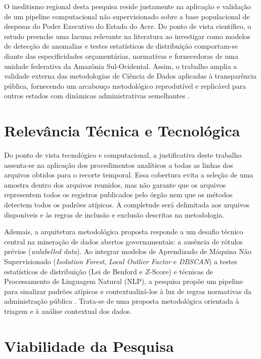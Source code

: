 \documentclass[
    12pt,               %
    openright,          %
    oneside,            %
    a4paper,            %
    chapter=TITLE,      %
    sumario=tradicional,%
    english,            %
    brazilian,          %
 ]{abntex2}
\begin{document}
O ineditismo regional desta pesquisa reside justamente na aplicação e validação de um pipeline computacional não supervisionado sobre a base populacional de despesas do Poder Executivo do Estado do Acre. Do ponto de vista científico, o estudo preenche uma lacuna relevante na literatura ao investigar como modelos de detecção de anomalias e testes estatísticos de distribuição comportam-se diante das especificidades orçamentárias, normativas e fornecedoras de uma unidade federativa da Amazônia Sul-Ocidental. Assim, o trabalho amplia a validade externa das metodologias de Ciência de Dados aplicadas à transparência pública, fornecendo um arcabouço metodológico reprodutível e replicável para outros estados com dinâmicas administrativas semelhantes \cite{pereira2025}.

\section{Relevância Técnica e Tecnológica}\label{sec:relevancia_tecnica}

Do ponto de vista tecnológico e computacional, a justificativa deste trabalho assenta-se na aplicação dos procedimentos analíticos a todas as linhas dos arquivos obtidos para o recorte temporal. Essa cobertura evita a seleção de uma amostra dentro dos arquivos reunidos, mas não garante que os arquivos representem todos os registros publicados pelo órgão nem que os métodos detectem todos os padrões atípicos. A completude será delimitada aos arquivos disponíveis e às regras de inclusão e exclusão descritas na metodologia.

Ademais, a arquitetura metodológica proposta responde a um desafio técnico central na mineração de dados abertos governamentais: a ausência de rótulos prévios (\textit{unlabelled data}). Ao integrar modelos de Aprendizado de Máquina Não Supervisionado (\textit{Isolation Forest}, \textit{Local Outlier Factor} e \textit{DBSCAN}) a testes estatísticos de distribuição (Lei de Benford e $Z$-Score) e técnicas de Processamento de Linguagem Natural (NLP), a pesquisa propõe um pipeline para sinalizar padrões atípicos e contextualizá-los à luz de regras normativas da administração pública \cite{cavalcanti2014, nunes2021, goldschmidt2005}. Trata-se de uma proposta metodológica orientada à triagem e à análise contextual dos dados.

\section{Viabilidade da Pesquisa}\label{sec:viabilidade}
\end{document}
